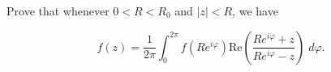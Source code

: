 Prove that whenever $0 < R < R_0$ and $|z| < R$, we have

$$
f(z) = \frac{1}{2 \pi} \int_{0}^{2 \pi} f(Re^{i \varphi}) \text{Re} \left( \frac{Re^{i \varphi} + z}{Re^{i \varphi} - z} \right) \; d\varphi.
$$